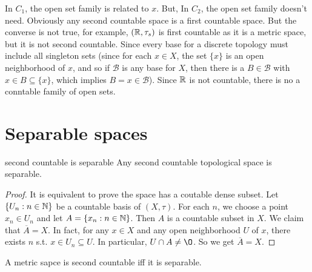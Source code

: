 \begin{remark}
    In $C_1$, the open set family is related to $x$. 
    But, In $C_2$, the open set family doesn't need.
    Obviously any second countable space is a first countable space. But the converse
is not true, for example, $(\mathbb{R}, \tau_s)$ is first countable as it is a metric space, but it is
not second countable. Since every base for a discrete topology must include all singleton sets 
(since for each $x\in X$, the set $\{x\}$ is an open neighborhood of $x$, and so if $\mathcal{B}$
is any base for $X$, then there is a $B\in \mathcal{B}$ with $x\in B\subseteq \{x\}$, 
which implies $B={x}\in\mathcal{B}$). Since $\mathbb{R}$ is not countable, there is no a conntable family of open sets.
\end{remark}

\section{Separable spaces}

\begin{proposition}{}{second countable is separable}
    Any second countable topological space is separable.
\end{proposition}
\begin{proof}
    It is equivalent to prove the space has a coutable dense subset.
    Let $\{U_n:n\in\mathbb{N}\}$ be a countable basis of $(X,\tau)$. For each $n$, we choose a point $x_n\in U_n$ and let $A=\{x_n:n\in\mathbb{N}\}$. 
    Then $A$ is a countable subset in $X$. We claim that $\overline{A}=X$. In fact, 
    for any $x\in X$ and any open neighborhood $U$ of $x$, there exists $n$ s.t. $x\in U_n\subseteq U$. 
    In particular, $U\cap A\neq \O$. So we get $\overline{A}=X$.
\end{proof}

\begin{proposition}{}{}
    A metric sapce is second countable iff it is separable.
\end{proposition}

